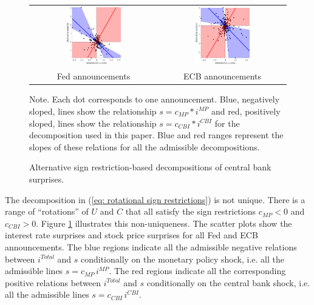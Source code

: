 \documentclass[a4paper,12pt]{article}
\begin{document}
\begin{figure}[!htbp]
\caption{Alternative sign restriction-based decompositions of central bank surprises.}\label{fig: rotation extremes}
\begin{center}
\begin{tabular}{cc}
\includegraphics[width=0.45\textwidth]{figures/us-pc1ff1_19_njto99_sp500_19_njto99-scatter-sign-signextreme}&
\includegraphics[width=0.45\textwidth]{figures/ea-pc1eon1_me_njt_stoxx50_me_njt-scatter-sign-signextreme}\\
Fed announcements & ECB announcements
\end{tabular}
\end{center}
\footnotesize Note. Each dot corresponds to one announcement. Blue, negatively sloped, lines show the relationship $s = c_{MP}* i^{MP}$ and red, positively sloped, lines show the relationship 
$s = c_{CBI}* i^{CBI}$ for the decomposition used in this paper. Blue and red ranges represent the slopes of these relations for all the admissible decompositions.
\end{figure}

The decomposition in (\ref{eq: rotational sign restrictions}) is not unique. There is a range of ``rotations'' of $U$ and $C$ that all satisfy the sign restrictions $c_{MP}<0$ and $c_{CBI}>0$. 
Figure \ref{fig: rotation extremes} illustrates this non-uniqueness.
The scatter plots show the interest rate surprises and stock price
surprises for all Fed and ECB announcements.
The blue regions indicate all the admissible negative relations between $i^{Total}$ and $s$ conditionally on
the monetary policy shock, i.e. all the admissible lines  $s = c_{MP}\,i^{MP}$. 
The red regions indicate all the corresponding positive relations between $i^{Total}$ and $s$ conditionally on
the central bank shock, i.e. all the admissible lines  $s = c_{CBI}\,i^{CBI}$. 
\end{document}
